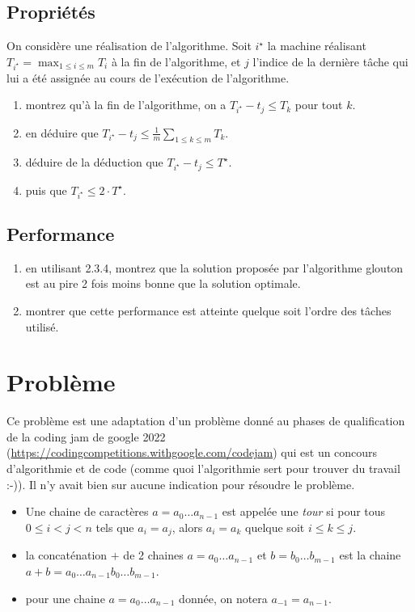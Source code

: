 \documentclass
[12pt]
{article}
\begin{document}
\subsection{Propriétés}

On considère une réalisation de l'algorithme. Soit $i^\star$ la machine réalisant $T_{i^\star} = \max_{1\leq i \leq m} T_i$ à la fin de l'algorithme, et $j$ l'indice de la dernière tâche qui lui a été assignée au cours de l'exécution de l'algorithme.

\begin{enumerate}
    \item montrez qu'à la fin de l'algorithme, on a $T_{i^\star} -t_j \leq T_k$ pour tout $k$.
    \item en déduire que $T_{i ^\star} - t_j \leq \frac{1}{m}\sum_{1\leq k\leq m}T_k$.
    \item déduire de la déduction que $T_{i ^\star} - t_j \leq T^\star$.
    \item puis que $T_{i ^\star} \leq 2 \cdot T^\star$.
\end{enumerate}

\subsection{Performance}

\begin{enumerate}
    \item en utilisant 2.3.4, montrez que la solution proposée par l'algorithme glouton est au pire 2 fois moins bonne que la solution optimale.
    \item montrer que cette performance est atteinte quelque soit l'ordre des tâches utilisé.
\end{enumerate}

\section{Problème}

Ce problème est une adaptation d'un problème donné au phases de qualification de la coding jam de google 2022 (\url{https://codingcompetitions.withgoogle.com/codejam}) qui est un concours d'algorithmie et de code (comme quoi l'algorithmie sert pour trouver du travail :-)). Il n'y avait bien sur aucune indication pour résoudre le problème.

\begin{itemize}
    \item Une chaine de caractères $a=a_0\dots a_{n-1}$ est appelée une {\em tour} si pour tous $0\leq i < j < n$ tels que $a_i = a_j$, alors $a_i = a_k$ quelque soit $i \leq k \leq j$.
    \item la concaténation $+$ de 2 chaines $a=a_0\dots a_{n-1}$ et $b = b_0\dots b_{m-1}$ est la chaine $a+b = a_0\dots a_{n-1}b_0 \dots b_{m-1}$.
    \item pour une chaine $a = a_0\dots a_{n-1}$ donnée, on notera $a_{-1} = a_{n-1}$.
\end{itemize}
\end{document}

